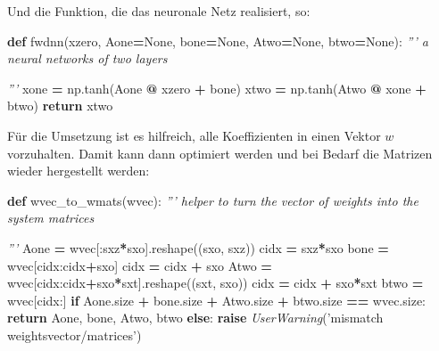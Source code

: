 \documentclass[]{book}
\newenvironment{Shaded}{\begin{snugshade}}{\end{snugshade}}
\newcommand{\CommentTok}[1]{\textcolor[rgb]{0.56,0.35,0.01}{\textit{#1}}}
\newcommand{\ControlFlowTok}[1]{\textcolor[rgb]{0.13,0.29,0.53}{\textbf{#1}}}
\newcommand{\KeywordTok}[1]{\textcolor[rgb]{0.13,0.29,0.53}{\textbf{#1}}}
\newcommand{\NormalTok}[1]{#1}
\newcommand{\OperatorTok}[1]{\textcolor[rgb]{0.81,0.36,0.00}{\textbf{#1}}}
\newcommand{\PreprocessorTok}[1]{\textcolor[rgb]{0.56,0.35,0.01}{\textit{#1}}}
\newcommand{\StringTok}[1]{\textcolor[rgb]{0.31,0.60,0.02}{#1}}
\newcommand{\VariableTok}[1]{\textcolor[rgb]{0.00,0.00,0.00}{#1}}
\theoremstyle{definition}
\theoremstyle{definition}
\theoremstyle{definition}
\theoremstyle{definition}
\theoremstyle{remark}
\begin{document}
Und die Funktion, die das neuronale Netz realisiert, so:

\begin{Shaded}
\begin{Highlighting}[]
\KeywordTok{def}\NormalTok{ fwdnn(xzero, Aone}\OperatorTok{=}\VariableTok{None}\NormalTok{, bone}\OperatorTok{=}\VariableTok{None}\NormalTok{, Atwo}\OperatorTok{=}\VariableTok{None}\NormalTok{, btwo}\OperatorTok{=}\VariableTok{None}\NormalTok{):}
    \CommentTok{''' a neural networks of two layers}

\CommentTok{    '''}
\NormalTok{    xone }\OperatorTok{=}\NormalTok{ np.tanh(Aone }\OperatorTok{@}\NormalTok{ xzero }\OperatorTok{+}\NormalTok{ bone)}
\NormalTok{    xtwo }\OperatorTok{=}\NormalTok{ np.tanh(Atwo }\OperatorTok{@}\NormalTok{ xone }\OperatorTok{+}\NormalTok{ btwo)}
    \ControlFlowTok{return}\NormalTok{ xtwo}
\end{Highlighting}
\end{Shaded}

Für die Umsetzung ist es hilfreich, alle Koeffizienten in einen Vektor \(w\) vorzuhalten. Damit kann dann optimiert werden und bei Bedarf die Matrizen wieder hergestellt werden:

\begin{Shaded}
\begin{Highlighting}[]
\KeywordTok{def}\NormalTok{ wvec_to_wmats(wvec):}
    \CommentTok{''' helper to turn the vector of weights into the system matrices}

\CommentTok{    '''}
\NormalTok{    Aone }\OperatorTok{=}\NormalTok{ wvec[:sxz}\OperatorTok{*}\NormalTok{sxo].reshape((sxo, sxz))}
\NormalTok{    cidx }\OperatorTok{=}\NormalTok{ sxz}\OperatorTok{*}\NormalTok{sxo}
\NormalTok{    bone }\OperatorTok{=}\NormalTok{ wvec[cidx:cidx}\OperatorTok{+}\NormalTok{sxo]}
\NormalTok{    cidx }\OperatorTok{=}\NormalTok{ cidx }\OperatorTok{+}\NormalTok{ sxo}
\NormalTok{    Atwo }\OperatorTok{=}\NormalTok{ wvec[cidx:cidx}\OperatorTok{+}\NormalTok{sxo}\OperatorTok{*}\NormalTok{sxt].reshape((sxt, sxo))}
\NormalTok{    cidx }\OperatorTok{=}\NormalTok{ cidx }\OperatorTok{+}\NormalTok{ sxo}\OperatorTok{*}\NormalTok{sxt}
\NormalTok{    btwo }\OperatorTok{=}\NormalTok{ wvec[cidx:]}
    \ControlFlowTok{if}\NormalTok{ Aone.size }\OperatorTok{+}\NormalTok{ bone.size }\OperatorTok{+}\NormalTok{ Atwo.size }\OperatorTok{+}\NormalTok{ btwo.size }\OperatorTok{==}\NormalTok{ wvec.size:}
        \ControlFlowTok{return}\NormalTok{ Aone, bone, Atwo, btwo}
    \ControlFlowTok{else}\NormalTok{:}
        \ControlFlowTok{raise} \PreprocessorTok{UserWarning}\NormalTok{(}\StringTok{'mismatch weightsvector/matrices'}\NormalTok{)}
\end{Highlighting}
\end{Shaded}
\end{document}
